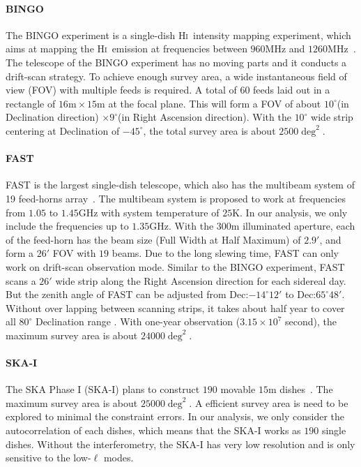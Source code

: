 \documentclass[twocolumn,floatfix,nofootinbib,aps,reprint]{revtex4}
\def\hi{\textsc{Hi~}}
\begin{document}
\paragraph{BINGO} 
The BINGO experiment is a single-dish \hi intensity 
mapping experiment, which aims at mapping the \hi emission at frequencies 
between $960 \mathrm{MHz}$ and $1260\mathrm{MHz}$~\cite{2013MNRAS.434.1239B,Battye16}. 
The telescope of the BINGO experiment has no moving parts and it conducts a drift-scan strategy. 
To achieve enough 
survey area, a wide instantaneous field of view (FOV) with multiple feeds
is required. A total of 60 feeds laid out in a rectangle of 
$16\mathrm{m}\times 15\mathrm{m}$ at the focal plane. This will form 
a FOV of about $10^\circ$(in Declination direction)
$\times 9^\circ$(in Right Ascension direction). With the $10^\circ$
wide strip centering at Declination of $-45^\circ$, the total survey
area is about $2500\deg^2$.

\paragraph{FAST}
FAST is the largest single-dish telescope, which also has the 
multibeam system of 19 feed-horns array~\cite{2011IJMPD..20..989N, 
2016RaSc...51.1060L}. 
The multibeam system is proposed to work at frequencies from 
$1.05$ to $1.45\mathrm{GHz}$ with system temperature 
of $25\mathrm{K}$. In our analysis, we only include the frequencies 
up to $1.35\mathrm{GHz}$. With the $300\mathrm{m}$ illuminated aperture,
each of the feed-horn has the beam size (Full Width at Half Maximum) 
of $2.9'$, and form a $26'$ FOV with $19$ beams.
Due to the long slewing time, FAST can only work on drift-scan 
observation mode. Similar to the BINGO experiment, FAST scans 
a $26'$ wide strip along the Right Ascension direction for each sidereal day.
But the zenith angle of FAST can be adjusted from Dec:$-14^\circ12'$ to
Dec:$65^\circ48'$. Without over lapping between scanning strips, 
it takes about half year to cover all $80^\circ$ Declination range . 
With one-year observation ($3.15 \times 10^{7}$ second), the maximum survey area is about $24000\deg^2$.

\paragraph{SKA-I} The SKA Phase I (SKA-I) plans to construct $190$
movable $15\mathrm{m}$ dishes~\cite{Bull15}. The maximum survey area is about 
$25000\deg^2$. A efficient survey area is need to be explored to 
minimal the constraint errors. In our analysis, we only consider the 
autocorrelation of each dishes, which means that the SKA-I works as 
$190$ single dishes. Without the interferometry, the SKA-I has
very low resolution and is only sensitive to the low-$\ell$ modes.
\end{document}

